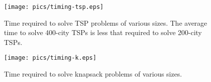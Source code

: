 \begin{figure}
\begin{center}
\texttt{[image: pics/timing-tsp.eps]}
\caption{Time required to solve TSP problems of various sizes.  The average time to solve 400-city TSPs is less that required to solve 200-city TSPs.}
\label{fig:timing-tsp}
\end{center}
\end{figure}

\begin{figure}
\begin{center}
\texttt{[image: pics/timing-k.eps]}
\caption{Time required to solve knapsack problems of various sizes.}
\label{fig:timing-k}
\end{center}
\end{figure}


